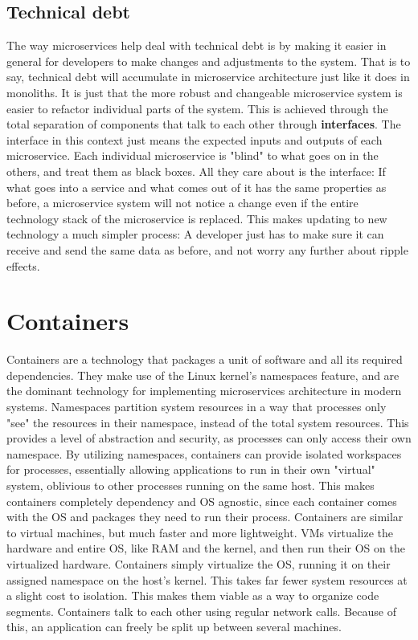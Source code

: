 \subsection{Technical debt}
The way microservices help deal with technical debt is by making it easier in general for developers to make changes and adjustments to the system.
That is to say, technical debt will accumulate in microservice architecture just like it does in monoliths.
It is just that the more robust and changeable microservice system is easier to refactor individual parts of the system.
This is achieved through the total separation of components that talk to each other through \textbf{interfaces}.
The interface in this context just means the expected inputs and outputs of each microservice.
Each individual microservice is "blind" to what goes on in the others, and treat them as black boxes.
All they care about is the interface: If what goes into a service and what comes out of it has the same properties as before, a microservice system will not notice a change even if the entire technology stack of the microservice is replaced.
This makes updating to new technology a much simpler process: A developer just has to make sure it can receive and send the same data as before, and not worry any further about ripple effects.

\section{Containers}
Containers are a technology that packages a unit of software and all its required dependencies.
They make use of the Linux kernel's namespaces feature, and are the dominant technology for implementing microservices architecture in modern systems.
Namespaces partition system resources in a way that processes only "see" the resources in their namespace, instead of the total system resources.
This provides a level of abstraction and security, as processes can only access their own namespace.
By utilizing namespaces, containers can provide isolated workspaces for processes, essentially allowing applications to run in their own "virtual" system, oblivious to other processes running on the same host.
This makes containers completely dependency and OS agnostic,
since each container comes with the OS and packages they need to run their process.
Containers are similar to virtual machines, but much faster and more lightweight.
VMs virtualize the hardware and entire OS, like RAM and the kernel, and then run their OS on the virtualized hardware.
Containers simply virtualize the OS, running it on their assigned namespace on the host's kernel.
This takes far fewer system resources at a slight cost to isolation.
This makes them viable as a way to organize code segments.
Containers talk to each other using regular network calls.
Because of this, an application can freely be split up between several machines.

